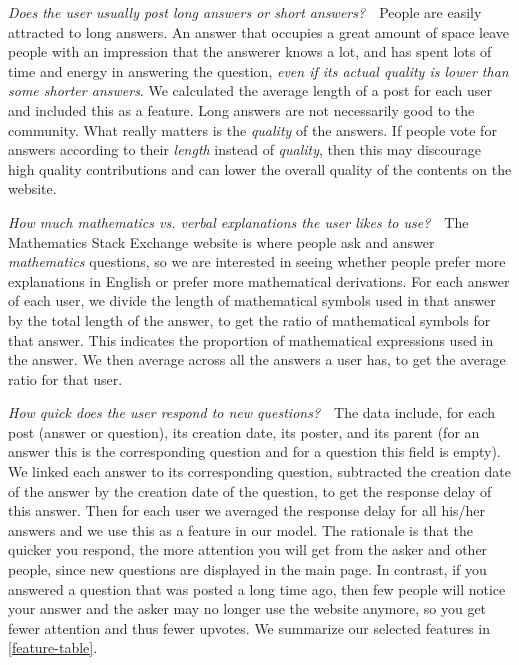 \documentclass[12pt]{article}
\begin{document}
\emph{Does the user usually post long answers or short answers?}~~People are easily attracted to long answers. An answer that occupies a great amount of space leave people with an impression that the answerer knows a lot, and has spent lots of time and energy in answering the question, \emph{even if its actual quality is lower than some shorter answers}. We calculated the average length of a post for each user and included this as a feature. Long answers are not necessarily good to the community. What really matters is the \emph{quality} of the answers. If people vote for answers according to their \emph{length} instead of \emph{quality}, then this may discourage high quality contributions and can lower the overall quality of the contents on the website.

\emph{How much mathematics vs. verbal explanations the user likes to use?}~~The Mathematics Stack Exchange website is where people ask and answer \emph{mathematics} questions, so we are interested in seeing whether people prefer more explanations in English or prefer more mathematical derivations. For each answer of each user, we divide the length of mathematical symbols used in that answer by the total length of the answer, to get the ratio of mathematical symbols for that answer. This indicates the proportion of mathematical expressions used in the answer. We then average across all the answers a user has, to get the average ratio for that user.

\emph{How quick does the user respond to new questions?}~~The data include, for each post (answer or question), its creation date, its poster, and its parent (for an answer this is the corresponding question and for a question this field is empty). We linked each answer to its corresponding question, subtracted the creation date of the answer by the creation date of the question, to get the response delay of this answer. Then for each user we averaged the response delay for all his/her answers and we use this as a feature in our model. The rationale is that the quicker you respond, the more attention you will get from the asker and other people, since new questions are displayed in the main page. In contrast, if you answered a question that was posted a long time ago, then few people will notice your answer and the asker may no longer use the website anymore, so you get fewer attention and thus fewer upvotes. We summarize our selected features in \cref{feature-table}.
\end{document}
